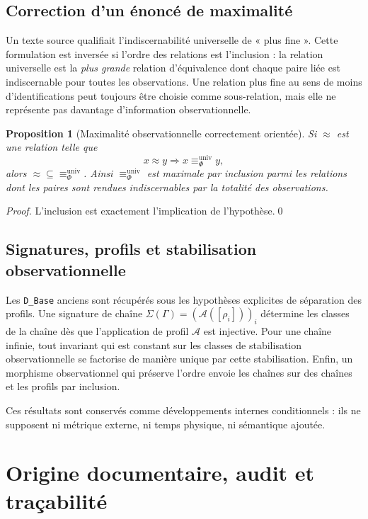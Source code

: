 \documentclass[11pt,a4paper,openany]{book}
\newtheorem{proposition}[definition]{Proposition}
\begin{document}
\section{Correction d'un énoncé de maximalité}
Un texte source qualifiait l'indiscernabilité universelle de « plus fine ». Cette formulation est inversée si l'ordre des relations est l'inclusion : la relation universelle est la \emph{plus grande} relation d'équivalence dont chaque paire liée est indiscernable pour toutes les observations. Une relation plus fine au sens de moins d'identifications peut toujours être choisie comme sous-relation, mais elle ne représente pas davantage d'information observationnelle.

\begin{proposition}[Maximalité observationnelle correctement orientée]
Si \(\approx\) est une relation telle que
\[
x\approx y\Longrightarrow x\equiv_{\Phi}^{\mathrm{univ}}y,
\]
alors \(\approx\subseteq\equiv_{\Phi}^{\mathrm{univ}}\). Ainsi \(\equiv_{\Phi}^{\mathrm{univ}}\) est maximale par inclusion parmi les relations dont les paires sont rendues indiscernables par la totalité des observations.
\end{proposition}
\begin{proof}
L'inclusion est exactement l'implication de l'hypothèse.\qed\end{proof}

\section{Signatures, profils et stabilisation observationnelle}
Les \texttt{D\_Base} anciens sont récupérés sous les hypothèses explicites de séparation des profils. Une signature de chaîne \(\Sigma(\Gamma)=(\mathcal A([\rho_i]))_i\) détermine les classes de la chaîne dès que l'application de profil \(\mathcal A\) est injective. Pour une chaîne infinie, tout invariant qui est constant sur les classes de stabilisation observationnelle se factorise de manière unique par cette stabilisation. Enfin, un morphisme observationnel qui préserve l'ordre envoie les chaînes sur des chaînes et les profils par inclusion.

Ces résultats sont conservés comme développements internes conditionnels : ils ne supposent ni métrique externe, ni temps physique, ni sémantique ajoutée.

\chapter{Origine documentaire, audit et traçabilité}
\end{document}

